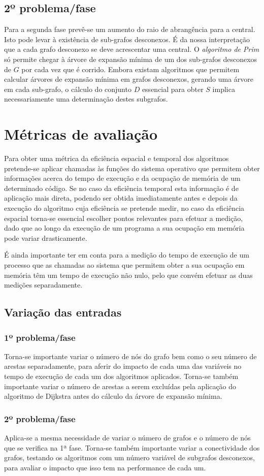\documentclass[a4paper,12pt,titlepage]{article}
\begin{document}
\subsection{2º problema/fase}
Para a segunda fase prevê-se um aumento do raio de abrangência para a central. Isto pode levar à existência de sub-grafos desconexos. É da nossa interpretação que a cada grafo desconexo se deve acrescentar uma central. O \emph{algoritmo de Prim} só permite chegar à árvore de expansão mínima de um dos sub-grafos desconexos de $G$ por cada vez que é corrido. Embora existam algoritmos que permitem calcular árvores de expansão mínima em grafos desconexos, gerando uma árvore em cada sub-grafo, o cálculo do conjunto $D$ essencial para obter $S$ implica necessariamente uma determinação destes subgrafos.




\section{Métricas de avaliação}
Para obter uma métrica da eficiência espacial e temporal dos algoritmos pretende-se aplicar chamadas às funções do sistema operativo que permitem obter informações acerca do tempo de execução e da ocupação de memória de um determinado código. Se no caso da eficiência temporal esta informação é de aplicação mais direta, podendo ser obtida imediatamente antes e depois da execução do algoritmo cuja eficiência se pretende medir, no caso da eficiência espacial torna-se essencial escolher pontos relevantes para efetuar a medição, dado que ao longo da execução de um programa a sua ocupação em memória pode variar drasticamente.
 
É ainda importante ter em conta para a medição do tempo de execução de um processo que as chamadas ao sistema que permitem obter a sua ocupação em memória têm um tempo de execução não nulo, pelo que convém efetuar as duas medições separadamente.
\subsection{Variação das entradas}
\subsubsection{1º problema/fase}
Torna-se importante variar o número de nós do grafo bem como o seu número de arestas separadamente, para aferir do impacto de cada uma das variáveis no tempo de execução de cada um dos algoritmos aplicados. Torna-se também importante variar o número de arestas a serem excluídas pela aplicação do algoritmo de Dijkstra antes do cálculo da árvore de expansão mínima. 
\subsubsection{2º problema/fase}
Aplica-se a mesma necessidade de variar o número de grafos e o número de nós que se verifica na 1ª fase. Torna-se também importante variar a conectividade dos grafos, testando os algoritmos com um número variável de subgrafos desconexos, para avaliar o impacto que isso tem na performance de cada um.




\newpage


\end{document}
